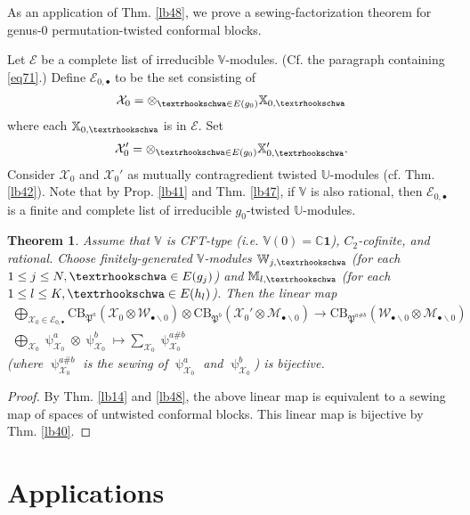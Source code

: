 \documentclass[11pt,b5paper,notitlepage]{article}
\theoremstyle{definition}
\theoremstyle{plain}
\newtheorem{thm}[df]{Theorem}
\newcommand{\fk}{\mathfrak}
\newcommand{\mc}{\mathcal}
\newcommand{\id}{\mathbf{1}}
\newcommand{\blt}{\bullet}
\newcommand{\Vbb}{\mathbb V}
\newcommand{\Ubb}{\mathbb U}
\newcommand{\Xbb}{\mathbb X}
\newcommand{\Wbb}{\mathbb W}
\newcommand{\Mbb}{\mathbb M}
\newcommand{\Cbb}{\mathbb C}
\newcommand{\CB}{\mathrm{CB}}
\newcommand{\tipae}{\text{\textrhookschwa}}
\numberwithin{equation}{subsection}
\begin{document}
As an application of Thm. \ref{lb48}, we prove a sewing-factorization theorem for genus-$0$ permutation-twisted conformal blocks.


Let $\mc E$ be a complete list of irreducible $\Vbb$-modules. (Cf. the paragraph containing \eqref{eq71}.) Define $\mc E_{0,\blt}$ to be the set consisting of
\begin{align*}
\mc X_0=\otimes_{\tipae\in E(g_0)}\Xbb_{0,\tipae}	
\end{align*}
where each $\Xbb_{0,\tipae}$ is in $\mc E$. Set
\begin{align*}
\mc X_0'=\otimes_{\tipae\in E(g_0)}\Xbb_{0,\tipae}'.	
\end{align*}	
Consider $\mc X_0$ and $\mc X_0'$  as mutually contragredient twisted $\Ubb$-modules (cf. Thm. \ref{lb42}). Note that by Prop. \ref{lb41} and Thm. \ref{lb47}, if $\Vbb$ is also rational, then $\mc E_{0,\blt}$ is a finite and complete list of irreducible $g_0$-twisted $\Ubb$-modules. 


\begin{thm}\label{lb62}
Assume that $\Vbb$ is CFT-type (i.e. $\Vbb(0)=\Cbb\id$), $C_2$-cofinite, and rational. Choose finitely-generated $\Vbb$-modules $\Wbb_{j,\tipae}$ (for each $1\leq j\leq N,\tipae\in E(g_j)$) and $\Mbb_{l,\tipae}$ (for each $1\leq l\leq K,\tipae\in E(h_l)$). Then the linear map
\begin{gather*}
\bigoplus_{\mc X_0\in\mc E_{0,\blt}}	\CB_{\fk P^a}(\mc X_0\otimes\mc W_{\blt\backslash0})\otimes 	\CB_{\fk P^b}(\mc X_0'\otimes\mc M_{\blt\backslash0})\rightarrow\CB_{\fk P^{a\#b}}(\mc W_{\blt\backslash0}\otimes \mc M_{\blt\backslash0})\\
\bigoplus_{\mc X_0} \uppsi^a_{\mc X_0}\otimes \uppsi^b_{\mc X_0}\mapsto \sum_{\mc X_0} \uppsi^{a\#b}_{\mc X_0}
\end{gather*}
(where $\uppsi^{a\#b}_{\mc X_0}$ is the sewing of $\uppsi^a_{\mc X_0}$ and $\uppsi^b_{\mc X_0}$) is bijective.
\end{thm}	


\begin{proof}
By Thm. \ref{lb14} and \ref{lb48}, the above linear map is equivalent to a sewing map of spaces of untwisted conformal blocks. This linear map is bijective by Thm. \ref{lb40}.
\end{proof}




\section{Applications}
\end{document}

